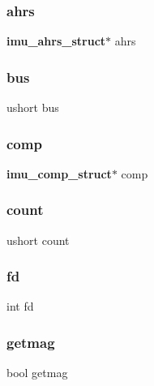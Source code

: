 \mbox{\label{structimu__struct_a11f32f7b32087dae99cdabf6eab98aaa}} 
\subsubsection{ahrs}
{\footnotesize\ttfamily \textbf{ imu\+\_\+ahrs\+\_\+struct}$\ast$ ahrs}

\mbox{\label{structimu__struct_a2b55e58fbbcfd629293ac20cb5366627}} 
\subsubsection{bus}
{\footnotesize\ttfamily ushort bus}

\mbox{\label{structimu__struct_a80bac0a9d7bd58f619ac1a4befe5fff3}} 
\subsubsection{comp}
{\footnotesize\ttfamily \textbf{ imu\+\_\+comp\+\_\+struct}$\ast$ comp}

\mbox{\label{structimu__struct_abdb9cc0450e750b312beaa4d70a6bde2}} 
\subsubsection{count}
{\footnotesize\ttfamily ushort count}

\mbox{\label{structimu__struct_a6f8059414f0228f0256115e024eeed4b}} 
\subsubsection{fd}
{\footnotesize\ttfamily int fd}

\mbox{\label{structimu__struct_a1267351f683eb6d9e11c337258ee5444}} 
\subsubsection{getmag}
{\footnotesize\ttfamily bool getmag}

